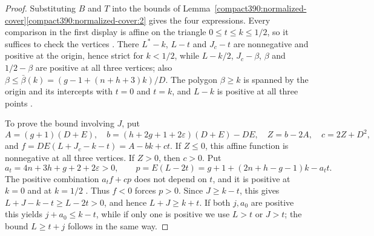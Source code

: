 \begin{proof}
Substituting $B$ and $T$ into the bounds of
Lemma~\ref{compact390:normalized-cover}\ref{compact390:normalized-cover:2}
gives the four expressions. Every comparison in the first display is affine
on the triangle $0\le t\le k\le1/2$, so it suffices to check the
vertices . There $L^*-k$, $L-t$ and $J_c-t$ are nonnegative and
positive at the origin, hence strict for $k<1/2$, while $L-k/2$,
$J_c-\beta$, $\beta$ and $1/2-\beta$ are positive at all three vertices;
also $\beta\le\bar\beta(k)=(g-1+(n+h+3)k)/D$.
The polygon $\beta\ge k$ is spanned by the origin and its intercepts with
$t=0$ and $t=k$, and $L-k$ is positive at all three points .

To prove the bound involving $J$, put
\[
 A=(g+1)(D+E),\quad b=(h+2g+1+2\varepsilon)(D+E)-DE,
 \quad Z=b-2A,\quad c=2Z+D^2,
\]
and $f=DE(L+J_c-k-t)=A-bk+ct$. If $Z\le0$, this affine function is
nonnegative at all three vertices. If $Z>0$, then $c>0$. Put
\[
 a_t=4n+3h+g+2+2\varepsilon>0,\qquad
 p=E(L-2t)=g+1+(2n+h-g-1)k-a_t t.
\]
The positive combination $a_tf+cp$ does not depend on $t$, and it is
positive at $k=0$ and at $k=1/2$ . Thus $f<0$ forces $p>0$.
Since $J\ge k-t$, this gives $L+J-k-t\ge L-2t>0$, and hence
$L+J\ge k+t$. If both $j,a_0$ are positive this yields
$j+a_0\le k-t$, while if only one is positive we use $L>t$ or $J>t$;
the bound $L\ge t+j$ follows in the same way.
\end{proof}

